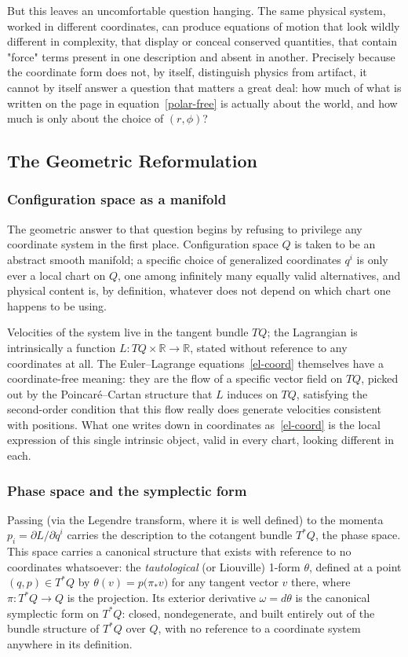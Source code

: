 But this leaves an uncomfortable question hanging. The same physical
system, worked in different coordinates, can produce equations of
motion that look wildly different in complexity, that display or
conceal conserved quantities, that contain "force" terms present in
one description and absent in another. Precisely because the
coordinate form does not, by itself, distinguish physics from
artifact, it cannot by itself answer a question that matters a great
deal: how much of what is written on the page in
equation~\eqref{polar-free} is actually about the world, and how
much is only about the choice of $(r,\phi)$?

\subsection{The Geometric Reformulation}

\subsubsection{Configuration space as a manifold}

The geometric answer to that question begins by refusing to
privilege any coordinate system in the first place. Configuration
space $Q$ is taken to be an abstract smooth manifold; a specific
choice of generalized coordinates $q^i$ is only ever a local chart on
$Q$, one among infinitely many equally valid alternatives, and
physical content is, by definition, whatever does not depend on
which chart one happens to be using.

Velocities of the system live in the tangent bundle $TQ$; the Lagrangian is
intrinsically a function $L : TQ\times\mathbb R \to \mathbb R$, stated without
reference to any coordinates at all. The Euler--Lagrange
equations~\eqref{el-coord} themselves have a coordinate-free meaning: they are
the flow of a specific vector field on $TQ$, picked out by the
Poincar\'e--Cartan structure that $L$ induces on $TQ$, satisfying the
second-order condition that this flow really does generate velocities
consistent with positions. What one writes down in coordinates
as~\eqref{el-coord} is the local expression of this single intrinsic object,
valid in every chart, looking different in each.

\subsubsection{Phase space and the symplectic form}

Passing (via the Legendre transform, where it is well defined) to
the momenta $p_i = \partial L/\partial \dot q^i$ carries the
description to the cotangent bundle $T^*Q$, the phase space. This
space carries a canonical structure that exists with reference to no
coordinates whatsoever: the \emph{tautological} (or Liouville) 1-form
$\theta$, defined at a point $(q,p)\in T^*Q$ by $\theta(v) =
p\bigl(\pi_*v\bigr)$ for any tangent vector $v$ there, where $\pi:
T^*Q\to Q$ is the projection. Its exterior derivative $\omega =
d\theta$ is the canonical symplectic form on $T^*Q$: closed,
nondegenerate, and built entirely out of the bundle structure of
$T^*Q$ over $Q$, with no reference to a coordinate system anywhere in
its definition.


